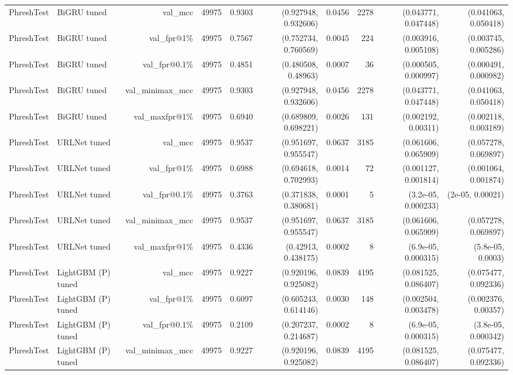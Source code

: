 \begin{table}[t]
\begin{tabular}{llrrrrrrrr}
PhreshTest & BiGRU tuned & val\_mcc & 49975 & 0.9303 & (0.927948, 0.932606) & 0.0456 & 2278 & (0.043771, 0.047448) & (0.041063, 0.050418) \\
PhreshTest & BiGRU tuned & val\_fpr@1\% & 49975 & 0.7567 & (0.752734, 0.760569) & 0.0045 & 224 & (0.003916, 0.005108) & (0.003745, 0.005286) \\
PhreshTest & BiGRU tuned & val\_fpr@0.1\% & 49975 & 0.4851 & (0.480508, 0.48963) & 0.0007 & 36 & (0.000505, 0.000997) & (0.000491, 0.000982) \\
PhreshTest & BiGRU tuned & val\_minimax\_mcc & 49975 & 0.9303 & (0.927948, 0.932606) & 0.0456 & 2278 & (0.043771, 0.047448) & (0.041063, 0.050418) \\
PhreshTest & BiGRU tuned & val\_maxfpr@1\% & 49975 & 0.6940 & (0.689809, 0.698221) & 0.0026 & 131 & (0.002192, 0.00311) & (0.002118, 0.003189) \\
PhreshTest & URLNet tuned & val\_mcc & 49975 & 0.9537 & (0.951697, 0.955547) & 0.0637 & 3185 & (0.061606, 0.065909) & (0.057278, 0.069897) \\
PhreshTest & URLNet tuned & val\_fpr@1\% & 49975 & 0.6988 & (0.694618, 0.702993) & 0.0014 & 72 & (0.001127, 0.001814) & (0.001064, 0.001874) \\
PhreshTest & URLNet tuned & val\_fpr@0.1\% & 49975 & 0.3763 & (0.371838, 0.380681) & 0.0001 & 5 & (3.2e-05, 0.000233) & (2e-05, 0.00021) \\
PhreshTest & URLNet tuned & val\_minimax\_mcc & 49975 & 0.9537 & (0.951697, 0.955547) & 0.0637 & 3185 & (0.061606, 0.065909) & (0.057278, 0.069897) \\
PhreshTest & URLNet tuned & val\_maxfpr@1\% & 49975 & 0.4336 & (0.42913, 0.438175) & 0.0002 & 8 & (6.9e-05, 0.000315) & (5.8e-05, 0.0003) \\
PhreshTest & LightGBM (P) tuned & val\_mcc & 49975 & 0.9227 & (0.920196, 0.925082) & 0.0839 & 4195 & (0.081525, 0.086407) & (0.075477, 0.092336) \\
PhreshTest & LightGBM (P) tuned & val\_fpr@1\% & 49975 & 0.6097 & (0.605243, 0.614146) & 0.0030 & 148 & (0.002504, 0.003478) & (0.002376, 0.00357) \\
PhreshTest & LightGBM (P) tuned & val\_fpr@0.1\% & 49975 & 0.2109 & (0.207237, 0.214687) & 0.0002 & 8 & (6.9e-05, 0.000315) & (3.8e-05, 0.000342) \\
PhreshTest & LightGBM (P) tuned & val\_minimax\_mcc & 49975 & 0.9227 & (0.920196, 0.925082) & 0.0839 & 4195 & (0.081525, 0.086407) & (0.075477, 0.092336) \\

\end{tabular}
\end{table}
